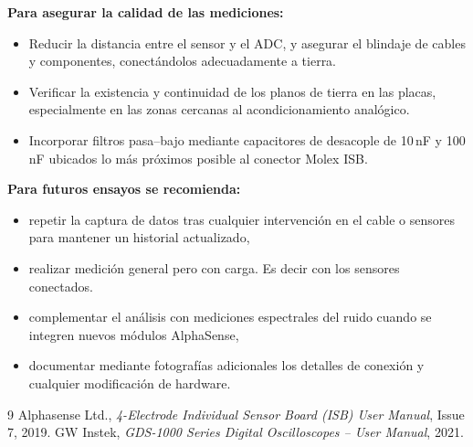 \documentclass[12pt,a4paper]{article}
\begin{document}
	\begin{tcolorbox}
	\textbf{Para asegurar la calidad de las mediciones:}
	\begin{itemize}
		\item Reducir la distancia entre el sensor y el ADC, y asegurar el blindaje de cables y componentes, conectándolos adecuadamente a tierra.
		\item Verificar la existencia y continuidad de los planos de tierra en las placas, especialmente en las zonas cercanas al acondicionamiento analógico.
		\item Incorporar filtros pasa–bajo mediante capacitores de desacople de 10\,nF y 100\,nF ubicados lo más próximos posible al conector Molex ISB.
	 \end{itemize}

    \textbf{Para futuros ensayos se recomienda:}
    \begin{itemize}
        \item repetir la captura de datos tras cualquier intervención en el cable o sensores para mantener un historial actualizado,
        \item realizar medición general pero con carga. Es decir con los sensores conectados.
        \item complementar el análisis con mediciones espectrales del ruido cuando se integren nuevos módulos AlphaSense,
        \item documentar mediante fotografías adicionales los detalles de conexión y cualquier modificación de hardware.
    \end{itemize}

\end{tcolorbox}



\begin{thebibliography}{9}
 Alphasense Ltd., \emph{4-Electrode Individual Sensor Board (ISB) User Manual}, Issue 7, 2019.
 GW Instek, \emph{GDS-1000 Series Digital Oscilloscopes – User Manual}, 2021.
\end{thebibliography}
\end{document}
